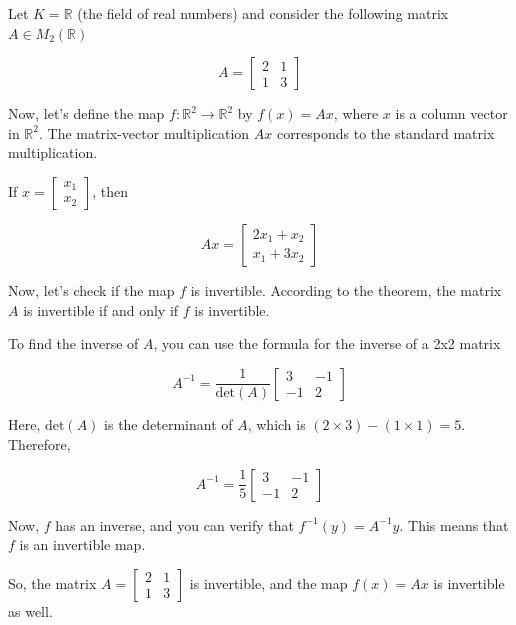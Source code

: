 \begin{example}
Let \( K = \mathbb{R} \) (the field of real numbers) and consider the following matrix \( A \in M_2(\mathbb{R}) \)

\[ A = \begin{bmatrix} 2 & 1 \\ 1 & 3 \end{bmatrix} \]

Now, let's define the map \( f : \mathbb{R}^2 \to \mathbb{R}^2 \) by \( f(x) = Ax \), where \( x \) is a column vector in \( \mathbb{R}^2 \). The matrix-vector multiplication \( Ax \) corresponds to the standard matrix multiplication.

If \( x = \begin{bmatrix} x_1 \\ x_2 \end{bmatrix} \), then

\[ Ax = \begin{bmatrix} 2x_1 + x_2 \\ x_1 + 3x_2 \end{bmatrix} \]

Now, let's check if the map \( f \) is invertible. According to the theorem, the matrix \( A \) is invertible if and only if \( f \) is invertible.

To find the inverse of \( A \), you can use the formula for the inverse of a 2x2 matrix

\[ A^{-1} = \frac{1}{\text{det}(A)} \begin{bmatrix} 3 & -1 \\ -1 & 2 \end{bmatrix} \]

Here, \( \text{det}(A) \) is the determinant of \( A \), which is \( (2 \times 3) - (1 \times 1) = 5 \). Therefore,

\[ A^{-1} = \frac{1}{5} \begin{bmatrix} 3 & -1 \\ -1 & 2 \end{bmatrix} \]

Now, \( f \) has an inverse, and you can verify that \( f^{-1}(y) = A^{-1}y \). This means that \( f \) is an invertible map.

So, the matrix \( A = \begin{bmatrix} 2 & 1 \\ 1 & 3 \end{bmatrix} \) is invertible, and the map \( f(x) = Ax \) is invertible as well.


\end{example}

